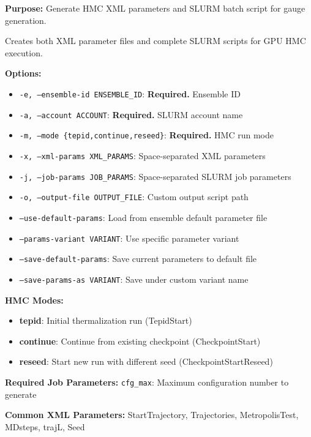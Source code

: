 \documentclass{article}
\begin{document}
\textbf{Purpose:} Generate HMC XML parameters and SLURM batch script for gauge generation.

Creates both XML parameter files and complete SLURM scripts for GPU HMC execution.

\textbf{Options:}
\begin{itemize}
\item \texttt{-e, --ensemble-id ENSEMBLE\_ID}: \textbf{Required.} Ensemble ID
\item \texttt{-a, --account ACCOUNT}: \textbf{Required.} SLURM account name
\item \texttt{-m, --mode \{tepid,continue,reseed\}}: \textbf{Required.} HMC run mode
\item \texttt{-x, --xml-params XML\_PARAMS}: Space-separated XML parameters
\item \texttt{-j, --job-params JOB\_PARAMS}: Space-separated SLURM job parameters  
\item \texttt{-o, --output-file OUTPUT\_FILE}: Custom output script path
\item \texttt{--use-default-params}: Load from ensemble default parameter file
\item \texttt{--params-variant VARIANT}: Use specific parameter variant  
\item \texttt{--save-default-params}: Save current parameters to default file
\item \texttt{--save-params-as VARIANT}: Save under custom variant name
\end{itemize}

\textbf{HMC Modes:}
\begin{itemize}
\item \textbf{tepid}: Initial thermalization run (TepidStart)
\item \textbf{continue}: Continue from existing checkpoint (CheckpointStart)  
\item \textbf{reseed}: Start new run with different seed (CheckpointStartReseed)
\end{itemize}

\textbf{Required Job Parameters:}
\texttt{cfg\_max}: Maximum configuration number to generate

\textbf{Common XML Parameters:}
StartTrajectory, Trajectories, MetropolisTest, MDsteps, trajL, Seed
\end{document}
